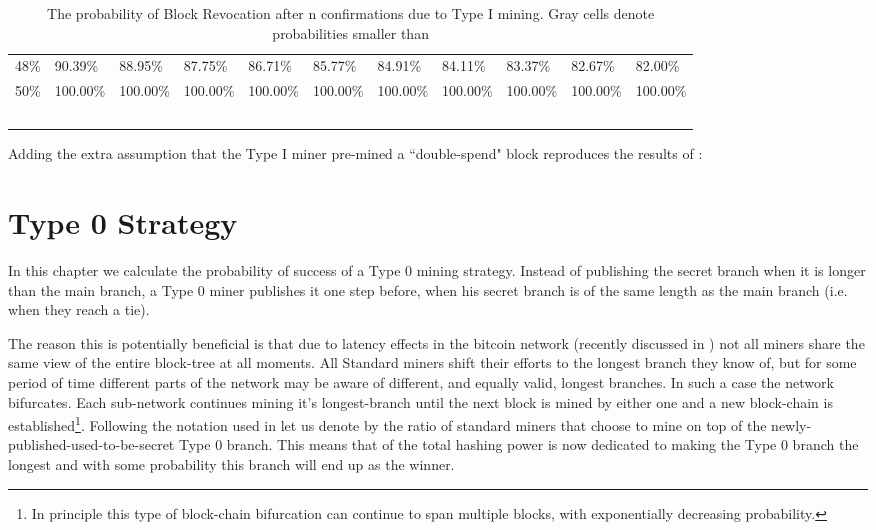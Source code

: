 \documentclass[letterpaper,12pt]{report}
\begin{document}
\begin{table}
{\begin{tabular}{l|llllllllll}
    48\% & 90.39\% & 88.95\% & 87.75\% & 86.71\% & 85.77\% & 84.91\% & 84.11\% & 83.37\% & 82.67\% & 82.00\% \\
    50\% & 100.00\% & 100.00\% & 100.00\% & 100.00\% & 100.00\% & 100.00\% & 100.00\% & 100.00\% & 100.00\% & 100.00\% \\
    ~   & ~       & ~       & ~       & ~       & ~       & ~       & ~       & ~       & ~       & ~       \\
    \end{tabular}
    }
    \caption {The probability of Block Revocation after n confirmations due to Type I mining. Gray cells denote probabilities smaller than }
\end{table}

Adding the extra assumption that the Type I miner pre-mined a ``double-spend" block reproduces the results of \cite{Doublespend}:





\chapter{Type 0 Strategy}

In this chapter we calculate the probability of success of a Type 0 mining strategy.
Instead of publishing the secret branch when it is longer than the main branch, a Type 0 miner publishes it one step before, when his secret branch is of the same length as the main branch (i.e. when they reach a tie). 

The reason this is potentially beneficial is that due to latency effects in the bitcoin network (recently discussed in \cite{Zoharetal}) not all miners share the same view of the entire block-tree at all moments. All Standard miners shift their efforts to the longest branch they know of, but for some period of time different parts of the network may be aware of different, and equally valid, longest branches. In such a case the network bifurcates. Each sub-network continues mining it's longest-branch until the next block is mined by either one and a new block-chain is established\footnote{In principle this type of block-chain bifurcation can continue to span multiple blocks, with exponentially decreasing probability.}. 
Following the notation used in \cite{Selfish} let us denote by  the ratio of standard miners that choose to mine on top of the newly-published-used-to-be-secret Type 0 branch.
This means that  of the total hashing power is now dedicated to making the Type 0 branch the longest and with some probability this branch will end up as the winner. 
\end{document}

